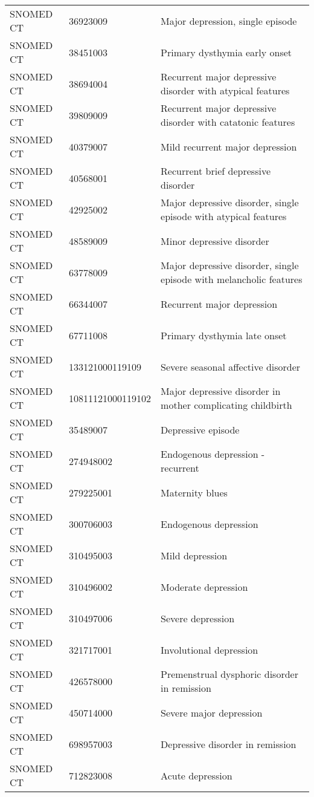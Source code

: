 \begin{longtable}{p{}p{}p{}}
  SNOMED CT & 36923009 & Major depression, single episode \\ 
  SNOMED CT & 38451003 & Primary dysthymia early onset \\ 
  SNOMED CT & 38694004 & Recurrent major depressive disorder with atypical features \\ 
  SNOMED CT & 39809009 & Recurrent major depressive disorder with catatonic features \\ 
  SNOMED CT & 40379007 & Mild recurrent major depression \\ 
  SNOMED CT & 40568001 & Recurrent brief depressive disorder \\ 
  SNOMED CT & 42925002 & Major depressive disorder, single episode with atypical features \\ 
  SNOMED CT & 48589009 & Minor depressive disorder \\ 
  SNOMED CT & 63778009 & Major depressive disorder, single episode with melancholic features \\ 
  SNOMED CT & 66344007 & Recurrent major depression \\ 
  SNOMED CT & 67711008 & Primary dysthymia late onset \\ 
  SNOMED CT & 133121000119109 & Severe seasonal affective disorder \\ 
  SNOMED CT & 10811121000119102 & Major depressive disorder in mother complicating childbirth \\ 
  SNOMED CT & 35489007 & Depressive episode \\ 
  SNOMED CT & 274948002 & Endogenous depression - recurrent \\ 
  SNOMED CT & 279225001 & Maternity blues \\ 
  SNOMED CT & 300706003 & Endogenous depression \\ 
  SNOMED CT & 310495003 & Mild depression \\ 
  SNOMED CT & 310496002 & Moderate depression \\ 
  SNOMED CT & 310497006 & Severe depression \\ 
  SNOMED CT & 321717001 & Involutional depression \\ 
  SNOMED CT & 426578000 & Premenstrual dysphoric disorder in remission \\ 
  SNOMED CT & 450714000 & Severe major depression \\ 
  SNOMED CT & 698957003 & Depressive disorder in remission \\ 
  SNOMED CT & 712823008 & Acute depression \\ 

\end{longtable}
